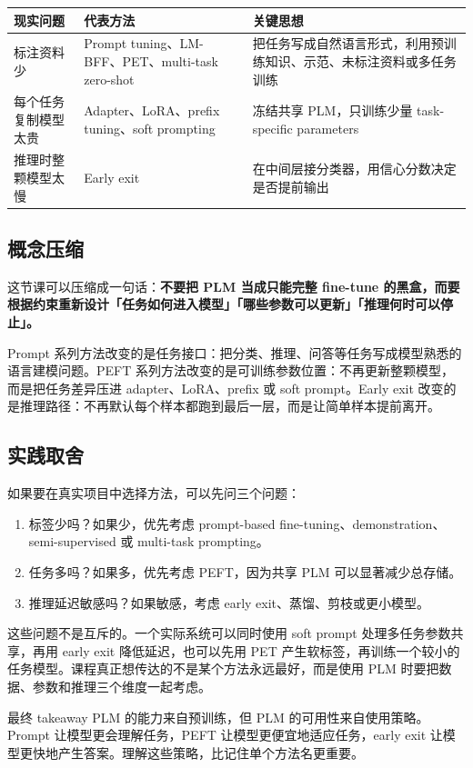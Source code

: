 \documentclass[a4paper]{article}
\begin{document}
\begin{center}
\begin{tabular}{L{3.2cm} L{5.4cm} L{5.3cm}}
\toprule
现实问题 & 代表方法 & 关键思想 \\
\midrule
标注资料少 & Prompt tuning、LM-BFF、PET、multi-task zero-shot & 把任务写成自然语言形式，利用预训练知识、示范、未标注资料或多任务训练 \\
每个任务复制模型太贵 & Adapter、LoRA、prefix tuning、soft prompting & 冻结共享 PLM，只训练少量 task-specific parameters \\
推理时整颗模型太慢 & Early exit & 在中间层接分类器，用信心分数决定是否提前输出 \\
\bottomrule
\end{tabular}
\end{center}

\subsection{概念压缩}

这节课可以压缩成一句话：\textbf{不要把 PLM 当成只能完整 fine-tune 的黑盒，而要根据约束重新设计「任务如何进入模型」「哪些参数可以更新」「推理何时可以停止」。}

Prompt 系列方法改变的是任务接口：把分类、推理、问答等任务写成模型熟悉的语言建模问题。PEFT 系列方法改变的是可训练参数位置：不再更新整颗模型，而是把任务差异压进 adapter、LoRA、prefix 或 soft prompt。Early exit 改变的是推理路径：不再默认每个样本都跑到最后一层，而是让简单样本提前离开。

\subsection{实践取舍}

如果要在真实项目中选择方法，可以先问三个问题：

\begin{enumerate}
    \item 标签少吗？如果少，优先考虑 prompt-based fine-tuning、demonstration、semi-supervised 或 multi-task prompting。
    \item 任务多吗？如果多，优先考虑 PEFT，因为共享 PLM 可以显著减少总存储。
    \item 推理延迟敏感吗？如果敏感，考虑 early exit、蒸馏、剪枝或更小模型。
\end{enumerate}

这些问题不是互斥的。一个实际系统可以同时使用 soft prompt 处理多任务参数共享，再用 early exit 降低延迟，也可以先用 PET 产生软标签，再训练一个较小的任务模型。课程真正想传达的不是某个方法永远最好，而是使用 PLM 时要把数据、参数和推理三个维度一起考虑。

\begin{importantbox}{最终 takeaway}
    PLM 的能力来自预训练，但 PLM 的可用性来自使用策略。Prompt 让模型更会理解任务，PEFT 让模型更便宜地适应任务，early exit 让模型更快地产生答案。理解这些策略，比记住单个方法名更重要。
\end{importantbox}
\end{document}
